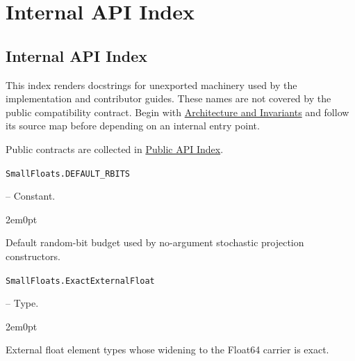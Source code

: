 \chapter{Internal API Index}


\section{Internal API Index}



\label{8390681323531530581}{}


This index renders docstrings for unexported machinery used by the implementation and contributor guides. These names are not covered by the public compatibility contract. Begin with \href{internals\_\allowbreak{}architecture.md}{Architecture and Invariants} and follow its source map before depending on an internal entry point.



Public contracts are collected in \href{reference\_\allowbreak{}public\_\allowbreak{}api.md}{Public API Index}.


\par\medskip\noindent\begin{minipage}{\linewidth}
\hypertarget{854920489278715424}{\texttt{SmallFloats.DEFAULT\_\allowbreak{}RBITS}}  -- {Constant.}
\nopagebreak
\begin{adjustwidth}{2em}{0pt}

Default random-bit budget used by no-argument stochastic projection constructors.



\end{adjustwidth}
\end{minipage}
\par\medskip

\par\medskip\noindent\begin{minipage}{\linewidth}
\hypertarget{889067273513895166}{\texttt{SmallFloats.ExactExternalFloat}}  -- {Type.}
\nopagebreak
\begin{adjustwidth}{2em}{0pt}

External float element types whose widening to the Float64 carrier is exact.



\end{adjustwidth}
\end{minipage}
\par\medskip


